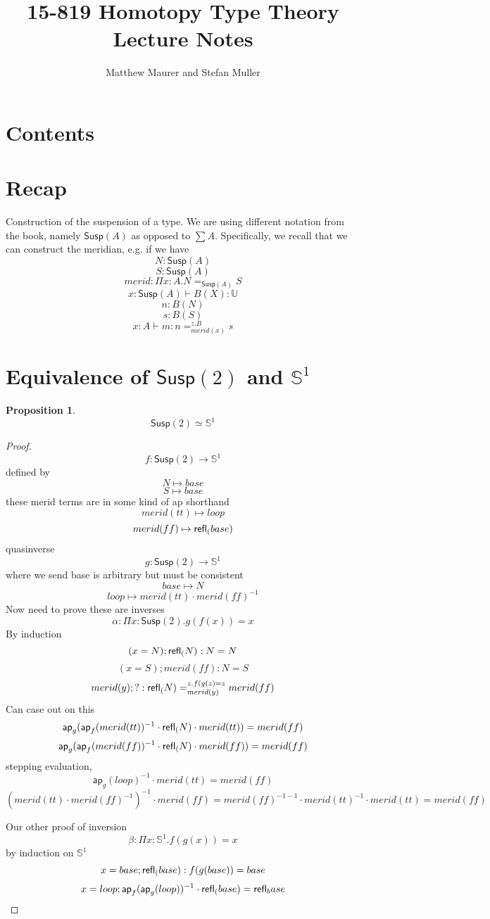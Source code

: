 \documentclass[11pt]{article}
\title{15-819 Homotopy Type Theory\\Lecture Notes}
\author{Matthew Maurer and Stefan Muller}
\newcommand{\U}{\mathbb{U}}
\renewcommand{\SS}{\mathbb{S}}
\newcommand*{\ap}{\mathsf{ap}}
\newcommand{\susp}[1]{\mathsf{Susp}(#1)}
\newtheorem{proposition}{Proposition}
\begin{document}
\maketitle
\section{Contents}
\section{Recap}
Construction of the suspension of a type. We are using different notation from the book, namely $\susp{A}$ as opposed to $\sum A$.
Specifically, we recall that we can construct the meridian, e.g. if we have
$$N : \susp{A}$$
$$S : \susp{A}$$
$$merid : \Pi x : A . N =_{\susp{A}} S$$
$$x : \susp{A} \vdash B(X) : \U$$
$$n : B(N)$$
$$s : B(S)$$
$$x : A \vdash m : n =_{merid(x)}^{z.B} s$$
\section{Equivalence of $\susp{2}$ and $\SS^1$}
\begin{proposition}
$$\susp{2} \simeq \SS^1$$
\end{proposition}
\begin{proof}
$$f : \susp{2} \rightarrow \SS^1$$
defined by 
$$N \mapsto base$$
$$S \mapsto base$$
these merid terms are in some kind of ap shorthand %
$$merid(tt) \mapsto loop$$
$$merid(ff) \mapsto \mathsf{refl}_{(} base)$$
quasinverse
$$g : \susp{2} \rightarrow \SS^1$$
where we send base is arbitrary but must be consistent
$$base \mapsto N$$
$$loop \mapsto merid(tt) \cdot merid(ff)^{-1}$$
Now need to prove these are inverses
$$\alpha : \Pi x : \susp{2} . g(f(x)) = x$$
By induction
$$(x = N); \mathsf{refl}_{(} N) : N = N$$
$$(x = S); merid(ff) : N = S$$
$$merid(y); ? : \mathsf{refl}_{(} N) =_{merid(y)}^{z.f(g(z) = z} merid(ff)$$
Can case out on this
$$\ap_g (\ap_f (merid(tt))^{-1} \cdot \refl(N) \cdot merid(tt)) = merid(ff)$$
$$\ap_g (\ap_f (merid(ff))^{-1} \cdot \refl(N) \cdot merid(ff)) = merid(ff)$$
stepping evaluation,
$$\ap_g (loop)^{-1} \cdot merid(tt) = merid(ff)$$
$$(merid(tt) \cdot merid(ff)^{-1})^{-1} \cdot merid(ff) = merid(ff)^{-1-1} \cdot merid(tt)^{-1} \cdot merid(tt) = merid(ff)$$

Our other proof of inversion
$$\beta : \Pi x : \SS^1 . f(g(x)) = x$$
by induction on $\SS^1$
$$x = base; \mathsf{refl}_{(} base) : f(g(base)) = base$$
$$x = loop; \ap_f(\ap_g(loop))^{-1} \cdot \refl(base) = \refl base $$
\end{proof}
\end{document}
